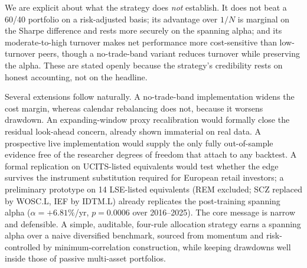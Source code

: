 We are explicit about what the strategy does \emph{not} establish. It does not beat
a 60/40 portfolio on a risk-adjusted basis; its advantage over $1/N$ is marginal on
the Sharpe difference and rests more securely on the spanning alpha; and its
moderate-to-high turnover makes net performance more cost-sensitive than
low-turnover peers, though a no-trade-band variant reduces turnover while preserving
the alpha. These are stated openly because the strategy's credibility rests on
honest accounting, not on the headline.

Several extensions follow naturally. A no-trade-band implementation widens the cost
margin, whereas calendar rebalancing does not, because it worsens drawdown. An
expanding-window proxy recalibration would formally close the residual look-ahead
concern, already shown immaterial on real data. A prospective live implementation
would supply the only fully out-of-sample evidence free of the researcher degrees of
freedom that attach to any backtest. A formal replication on UCITS-listed
equivalents would test whether the edge survives the instrument substitution
required for European retail investors; a preliminary prototype on 14 LSE-listed
equivalents (REM excluded; SCZ replaced by WOSC.L, IEF by IDTM.L) already replicates
the post-training spanning alpha ($\alpha = +6.81\%$/yr, $p = 0.0006$ over
2016--2025). The core message is narrow and defensible. A simple, auditable,
four-rule allocation strategy earns a spanning alpha over a naive diversified
benchmark, sourced from momentum and risk-controlled by minimum-correlation
construction, while keeping drawdowns well inside those of passive multi-asset
portfolios.
